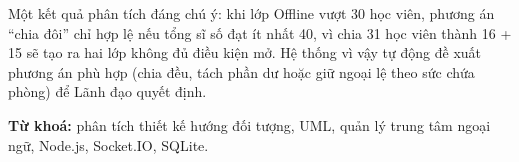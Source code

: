 Một kết quả phân tích đáng chú ý: khi lớp Offline vượt 30 học viên, phương án “chia đôi” chỉ hợp lệ nếu tổng sĩ số đạt ít nhất 40, vì chia 31 học viên thành 16 + 15 sẽ tạo ra hai lớp không đủ điều kiện mở. Hệ thống vì vậy tự động đề xuất phương án phù hợp (chia đều, tách phần dư hoặc giữ ngoại lệ theo sức chứa phòng) để Lãnh đạo quyết định.

\noindent\textbf{Từ khoá:} phân tích thiết kế hướng đối tượng, UML, quản lý trung tâm ngoại ngữ, Node.js, Socket.IO, SQLite.
